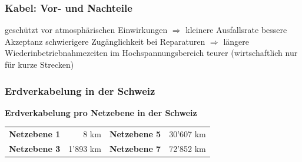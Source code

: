 \subsubsection{Kabel: Vor- und Nachteile}
    \begin{itemize}
        \pro geschützt vor atmosphärischen Einwirkungen $\Rightarrow$ kleinere Ausfallsrate
        \pro bessere Akzeptanz
    \vspace{1em}
        \con schwierigere Zugänglichkeit bei Reparaturen $\Rightarrow$ längere Wiederinbetriebnahmezeiten
        \con im Hochspannungsbereich teurer (wirtschaftlich nur für kurze Strecken)
    \end{itemize}

\subsubsection{Erdverkabelung in der Schweiz}
    \textbf{Erdverkabelung pro Netzebene in der Schweiz}\\
    \begin{tabular}{>{\bfseries}l r >{\bfseries}l r}
        Netzebene 1 & 8 km      & Netzebene 5 & 30'607 km \\
        Netzebene 3 & 1'893 km  & Netzebene 7 & 72'852 km \\
    \end{tabular}

